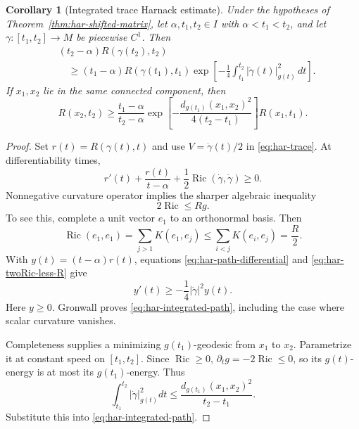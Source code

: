 \documentclass[10pt]{coll-l}
\newtheorem{corollary}[theorem]{Corollary}
\theoremstyle{definition}
\theoremstyle{remark}
\numberwithin{section}{chapter}
\numberwithin{equation}{chapter}
\newcommand{\Ric}{\operatorname{Ric}}
\begin{document}
\begin{corollary}[Integrated trace Harnack estimate]
\label{cor:har-integrated}
Under the hypotheses of Theorem~\ref{thm:har-shifted-matrix}, let
$\alpha,t_1,t_2\in I$ with $\alpha<t_1<t_2$, and let
$\gamma:[t_1,t_2]\to M$ be piecewise $C^1$.  Then
\begin{equation}
 \begin{split}
 &(t_2-\alpha)R(\gamma(t_2),t_2)\\
 &\quad\geq(t_1-\alpha)R(\gamma(t_1),t_1)
 \exp\!\left[-\frac14\int_{t_1}^{t_2}
                |\dot\gamma(t)|_{g(t)}^2\,dt\right].    \label{eq:har-integrated-path}
 \end{split}
\end{equation}
If $x_1,x_2$ lie in the same connected component, then
\begin{equation}
 R(x_2,t_2)\geq\frac{t_1-\alpha}{t_2-\alpha}
 \exp\!\left[-\frac{d_{g(t_1)}(x_1,x_2)^2}
                         {4(t_2-t_1)}\right]R(x_1,t_1). \label{eq:har-integrated-distance}
\end{equation}
\end{corollary}

\begin{proof}
Set $r(t)=R(\gamma(t),t)$ and use
$V=\dot\gamma(t)/2$ in \eqref{eq:har-trace}.  At differentiability times,
\begin{equation}
 r'(t)+\frac{r(t)}{t-\alpha}
       +\frac12\Ric(\dot\gamma,\dot\gamma)\geq0.        \label{eq:har-path-differential}
\end{equation}
Nonnegative curvature operator implies the sharper algebraic inequality
\begin{equation}
                         2\Ric\leq Rg.                   \label{eq:har-twoRic-less-R}
\end{equation}
To see this, complete a unit vector $e_1$ to an orthonormal basis.  Then
\[
 \Ric(e_1,e_1)=\sum_{j>1}K(e_1,e_j)
 \leq\sum_{i<j}K(e_i,e_j)=\frac R2.
\]
With $y(t)=(t-\alpha)r(t)$, equations
\eqref{eq:har-path-differential} and \eqref{eq:har-twoRic-less-R} give
\[
                    y'(t)\geq-\frac14|\dot\gamma|^2y(t).
\]
Here $y\geq0$.  Gronwall proves \eqref{eq:har-integrated-path}, including
the case where scalar curvature vanishes.

Completeness supplies a minimizing $g(t_1)$-geodesic from $x_1$ to $x_2$.
Parametrize it at constant speed on $[t_1,t_2]$.  Since $\Ric\geq0$,
$\partial_tg=-2\Ric\leq0$, so its $g(t)$-energy is at most its
$g(t_1)$-energy.  Thus
\[
 \int_{t_1}^{t_2}|\dot\gamma|_{g(t)}^2dt
       \leq\frac{d_{g(t_1)}(x_1,x_2)^2}{t_2-t_1}.
\]
Substitute this into \eqref{eq:har-integrated-path}.
\end{proof}
\end{document}
